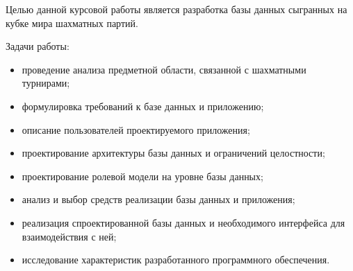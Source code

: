 
Целью данной курсовой работы является разработка базы данных сыгранных на кубке мира шахматных партий.

Задачи работы:
\begin{itemize}
	\item проведение анализа предметной области, связанной с шахматными турнирами;
	\item формулировка требований к базе данных и приложению;
	\item описание пользователей проектируемого приложения;
	\item проектирование архитектуры базы данных и ограничений целостности;
	\item проектирование ролевой модели на уровне базы данных;
	\item анализ и выбор средств реализации базы данных и приложения;
	\item реализация спроектированной базы данных и необходимого интерфейса для взаимодействия с ней;
	\item исследование характеристик разработанного программного обеспечения.
\end{itemize}

\clearpage
